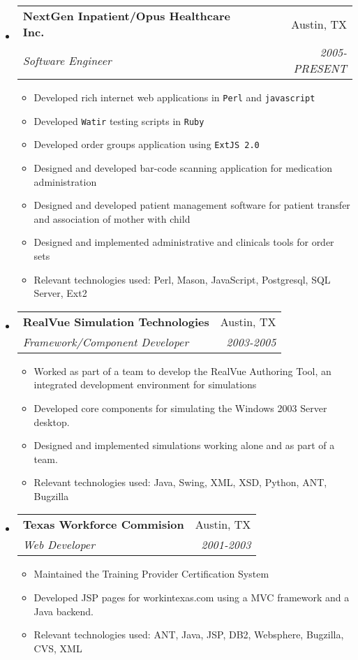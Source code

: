 \documentclass[letterpaper,10pt]{article}
\makeatletter
\newcommand{\resitem}[1]{\item #1 \vspace{-2pt}}
\newcommand{\ressubheading}[4]{

\begin{tabular*}{6.5in}{l@{\cftdotfill{\cftsecdotsep}\extracolsep{\fill}}r}

		\textbf{#1} & #2 \\

		\textit{#3} & \textit{#4} \\

\end{tabular*}\vspace{-6pt}}
\makeatother
\begin{document}
\begin{itemize}

\item

  \ressubheading{NextGen Inpatient/Opus Healthcare Inc.}{Austin, TX}{Software Engineer}{2005-PRESENT}
  
  \begin{itemize}

    \resitem{Developed rich internet web applications in \texttt{Perl} and \texttt{javascript}}
    \resitem{Developed \texttt{Watir} testing scripts in \texttt{Ruby}}
    \resitem{Developed order groups application using \texttt{ExtJS 2.0}}
    \resitem{Designed and developed bar-code scanning application for medication
         		administration}
    \resitem{Designed and developed patient management software for patient transfer and 
		association of mother with child}
    \resitem{Designed and implemented administrative and clinicals tools for order sets}
    \resitem{Relevant technologies used: Perl, Mason, JavaScript, Postgresql, SQL Server, Ext2}

  \end{itemize}

\item

  \ressubheading{RealVue Simulation Technologies}{Austin, TX}{Framework/Component Developer}{2003-2005}

  \begin{itemize}

    \resitem{Worked as part of a team to develop the RealVue Authoring Tool, an
      integrated development environment for simulations}
    \resitem{Developed core components for simulating the Windows 2003 Server desktop.}
    \resitem{Designed and implemented simulations working alone and as part of a team.}
    \resitem{Relevant technologies used: Java, Swing, XML, XSD, Python, ANT, Bugzilla}

  \end{itemize}

\item 

  \ressubheading{Texas Workforce Commision}{Austin, TX}{Web Developer}{2001-2003}
  \begin{itemize}
    
    \resitem{Maintained the Training Provider Certification System}
    \resitem{Developed JSP pages for workintexas.com using a MVC framework and a Java
	backend.}
    \resitem{Relevant technologies used: ANT, Java, JSP, DB2, Websphere, Bugzilla, CVS, XML}
  \end{itemize}


\end{itemize}
\end{document}
